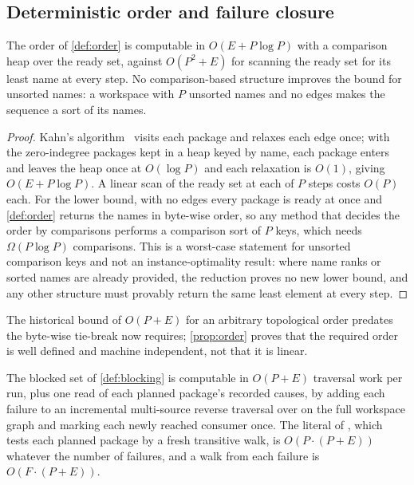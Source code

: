 \subsection{Deterministic order and failure closure}

\begin{proposition}
\label{prop:heap}
The order of \cref{def:order} is computable in $O(E + P \log P)$ with a
comparison heap over the ready set, against $O(P^2 + E)$ for scanning the
ready set for its least name at every step. No comparison-based structure
improves the bound for unsorted names: a workspace with $P$ unsorted names and
no edges makes the sequence a sort of its names.
\end{proposition}

\begin{proof}
Kahn's algorithm~\cite{kahn} visits each package and relaxes each edge once;
with the zero-indegree packages kept in a heap keyed by name, each package
enters and leaves the heap once at $O(\log P)$ and each relaxation is $O(1)$,
giving $O(E + P \log P)$. A linear scan of the ready set at each of $P$ steps
costs $O(P)$ each. For the lower bound, with no edges every package is ready
at once and \cref{def:order} returns the names in byte-wise order, so any
method that decides the order by comparisons performs a comparison sort of
$P$ keys, which needs $\Omega(P \log P)$ comparisons. This is a worst-case
statement for unsorted comparison keys and not an instance-optimality result:
where name ranks or sorted names are already provided, the reduction proves
no new lower bound, and any other structure must provably return the same
least element at every step.
\end{proof}

The historical bound of $O(P + E)$ for an arbitrary topological order predates
the byte-wise tie-break  now requires; \cref{prop:order} proves
that the required order is well defined and machine independent, not that it
is linear.

\begin{proposition}
\label{prop:closure}
The blocked set of \cref{def:blocking} is computable in $O(P + E)$ traversal
work per run, plus one read of each planned package's recorded causes, by
adding each failure to an incremental multi-source reverse traversal over
 on the full workspace graph and marking each
newly reached consumer once. The literal  of , which
tests each planned package by a fresh transitive walk, is $O(P \cdot (P +
E))$ whatever the number of failures, and a walk from each failure is $O(F
\cdot (P + E))$.
\end{proposition}

